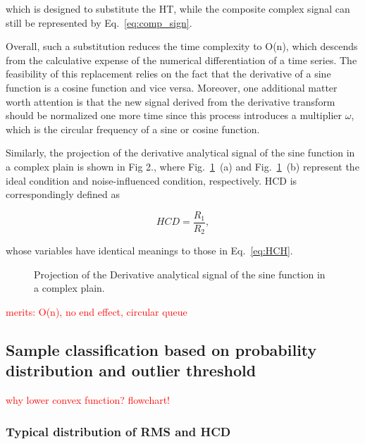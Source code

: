 \documentclass[preprint, 3p, times, compress, 11pt]{elsarticle}
\begin{document}
which is designed to substitute the HT, while the composite complex 
signal can still be represented by Eq.~\eqref{eq:comp_sign}.

Overall, such a substitution reduces the time complexity to O(n), which 
descends from the calculative expense of the numerical differentiation 
of a time series. The feasibility of this replacement relies on the 
fact that the derivative of a sine function is a cosine function and 
vice versa. Moreover, one additional matter worth attention is that 
the new signal derived from the derivative transform should be normalized 
one more time since this process introduces a multiplier $\omega$, which 
is the circular frequency of a sine or cosine function. 

Similarly, the projection of the derivative analytical signal of the sine 
function in a complex plain is shown in Fig 2., where Fig.~\ref{fig:proj_deri}~(a) 
and Fig.~\ref{fig:proj_deri}~(b) represent the ideal condition and 
noise-influenced condition, respectively. HCD is correspondingly defined as 

\begin{equation}
    HCD = \frac{R_1}{R_2},
    \label{eq:HCD}
\end{equation}

whose variables have identical meanings to those in Eq.~\eqref{eq:HCH}.

\begin{figure}[ht]
    \centering
    \qquad
    \caption{Projection of the Derivative analytical signal of the sine 
            function in a complex plain.}
    \label{fig:proj_deri}
\end{figure}

\textcolor{red}{
    merits: O(n), no end effect, circular queue
}

\subsection{Sample classification based on probability distribution and 
        outlier threshold}

\textcolor{red}{
    why lower convex function?
    flowchart!
}

\subsubsection{Typical distribution of RMS and HCD}
\end{document}
